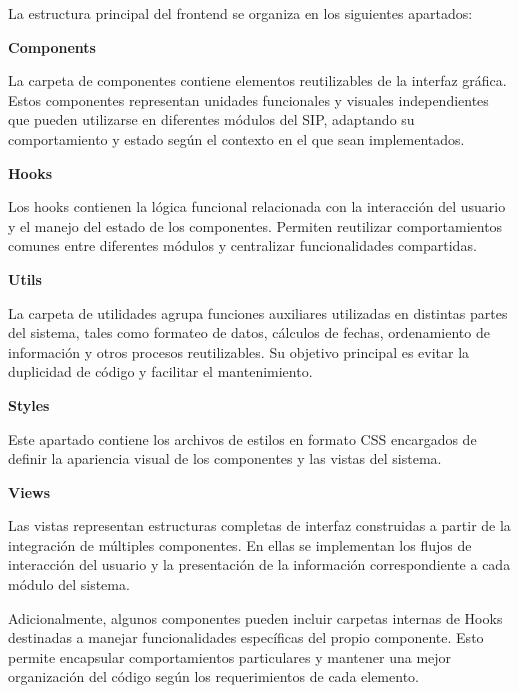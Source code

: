 La estructura principal del frontend se organiza en los siguientes apartados:

\textbf{Components}

La carpeta de componentes contiene elementos reutilizables de la interfaz gráfica. Estos componentes representan unidades funcionales y visuales independientes que pueden utilizarse en diferentes módulos del SIP, adaptando su comportamiento y estado según el contexto en el que sean implementados.

\textbf{Hooks}

Los hooks contienen la lógica funcional relacionada con la interacción del usuario y el manejo del estado de los componentes. Permiten reutilizar comportamientos comunes entre diferentes módulos y centralizar funcionalidades compartidas.

\textbf{Utils}

La carpeta de utilidades agrupa funciones auxiliares utilizadas en distintas partes del sistema, tales como formateo de datos, cálculos de fechas, ordenamiento de información y otros procesos reutilizables. Su objetivo principal es evitar la duplicidad de código y facilitar el mantenimiento.

\textbf{Styles}

Este apartado contiene los archivos de estilos en formato CSS encargados de definir la apariencia visual de los componentes y las vistas del sistema.

\textbf{Views}

Las vistas representan estructuras completas de interfaz construidas a partir de la integración de múltiples componentes. En ellas se implementan los flujos de interacción del usuario y la presentación de la información correspondiente a cada módulo del sistema.

Adicionalmente, algunos componentes pueden incluir carpetas internas de Hooks destinadas a manejar funcionalidades específicas del propio componente. Esto permite encapsular comportamientos particulares y mantener una mejor organización del código según los requerimientos de cada elemento.